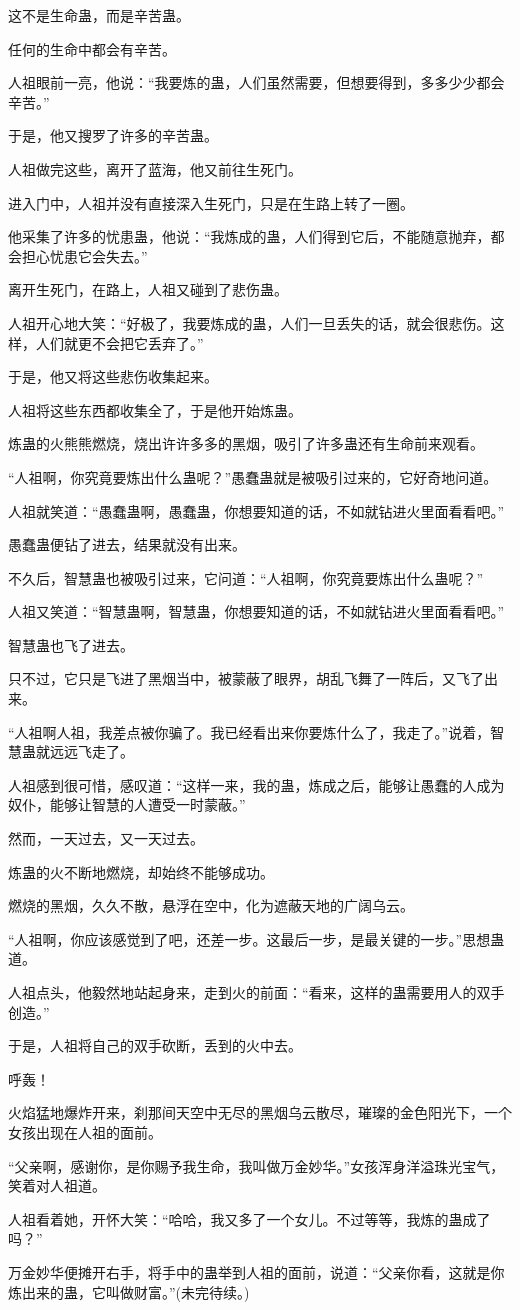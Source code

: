 \begin{this_body}
这不是生命蛊，而是辛苦蛊。

任何的生命中都会有辛苦。

人祖眼前一亮，他说：“我要炼的蛊，人们虽然需要，但想要得到，多多少少都会辛苦。”

于是，他又搜罗了许多的辛苦蛊。

人祖做完这些，离开了蓝海，他又前往生死门。

进入门中，人祖并没有直接深入生死门，只是在生路上转了一圈。

他采集了许多的忧患蛊，他说：“我炼成的蛊，人们得到它后，不能随意抛弃，都会担心忧患它会失去。”

离开生死门，在路上，人祖又碰到了悲伤蛊。

人祖开心地大笑：“好极了，我要炼成的蛊，人们一旦丢失的话，就会很悲伤。这样，人们就更不会把它丢弃了。”

于是，他又将这些悲伤收集起来。

人祖将这些东西都收集全了，于是他开始炼蛊。

炼蛊的火熊熊燃烧，烧出许许多多的黑烟，吸引了许多蛊还有生命前来观看。

“人祖啊，你究竟要炼出什么蛊呢？”愚蠢蛊就是被吸引过来的，它好奇地问道。

人祖就笑道：“愚蠢蛊啊，愚蠢蛊，你想要知道的话，不如就钻进火里面看看吧。”

愚蠢蛊便钻了进去，结果就没有出来。

不久后，智慧蛊也被吸引过来，它问道：“人祖啊，你究竟要炼出什么蛊呢？”

人祖又笑道：“智慧蛊啊，智慧蛊，你想要知道的话，不如就钻进火里面看看吧。”

智慧蛊也飞了进去。

只不过，它只是飞进了黑烟当中，被蒙蔽了眼界，胡乱飞舞了一阵后，又飞了出来。

“人祖啊人祖，我差点被你骗了。我已经看出来你要炼什么了，我走了。”说着，智慧蛊就远远飞走了。

人祖感到很可惜，感叹道：“这样一来，我的蛊，炼成之后，能够让愚蠢的人成为奴仆，能够让智慧的人遭受一时蒙蔽。”

然而，一天过去，又一天过去。

炼蛊的火不断地燃烧，却始终不能够成功。

燃烧的黑烟，久久不散，悬浮在空中，化为遮蔽天地的广阔乌云。

“人祖啊，你应该感觉到了吧，还差一步。这最后一步，是最关键的一步。”思想蛊道。

人祖点头，他毅然地站起身来，走到火的前面：“看来，这样的蛊需要用人的双手创造。”

于是，人祖将自己的双手砍断，丢到的火中去。

呼轰！

火焰猛地爆炸开来，刹那间天空中无尽的黑烟乌云散尽，璀璨的金色阳光下，一个女孩出现在人祖的面前。

“父亲啊，感谢你，是你赐予我生命，我叫做万金妙华。”女孩浑身洋溢珠光宝气，笑着对人祖道。

人祖看着她，开怀大笑：“哈哈，我又多了一个女儿。不过等等，我炼的蛊成了吗？”

万金妙华便摊开右手，将手中的蛊举到人祖的面前，说道：“父亲你看，这就是你炼出来的蛊，它叫做财富。”(未完待续。)

\end{this_body}

